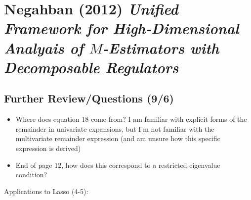 \documentclass[11pt]{article}
\begin{document}
	
\newpage 

\section*{Negahban (2012) {\large \it Unified Framework for High-Dimensional Analyais of $M$-Estimators with Decomposable Regulators}}

\subsection*{Further Review/Questions (9/6)}
\begin{itemize}
	\item{Where does equation 18 come from? I am familiar with explicit forms of the remainder in univariate expansions, but I'm not familiar with the multivariate remainder expression (and am unsure how this specific expression is derived)}
	\item End of page 12, how does this correspond to a restricted eigenvalue condition? 
\end{itemize}

Applications to Lasso (4-5):
\end{document}
